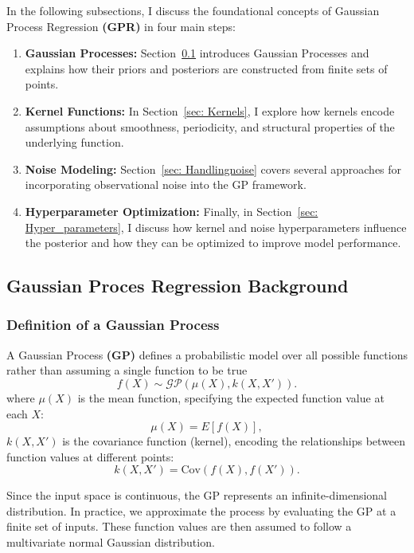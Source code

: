 \documentclass{article}
\begin{document}
In the following subsections, I discuss the foundational concepts of Gaussian Process Regression \textbf{(GPR)} in four main steps:
\begin{enumerate}
    \item \textbf{Gaussian Processes:} Section~\ref{sec: GP_backgroound} introduces Gaussian Processes and explains how their priors and posteriors are constructed from finite sets of points.
    \item \textbf{Kernel Functions:} In Section~\ref{sec: Kernels}, I explore how kernels encode assumptions about smoothness, periodicity, and structural properties of the underlying function.
    \item \textbf{Noise Modeling:} Section~\ref{sec: Handlingnoise} covers several approaches for incorporating observational noise into the GP framework.
    \item \textbf{Hyperparameter Optimization:} Finally, in Section~\ref{sec: Hyper_parameters}, I discuss how kernel and noise hyperparameters influence the posterior and how they can be optimized to improve model performance.
\end{enumerate}

\subsection{Gaussian Proces Regression Background}
\label{sec: GP_backgroound}

\subsubsection*{Definition of a Gaussian Process}
\label{sec: Definition_of_GP}

A Gaussian Process \textbf{(GP)} defines a probabilistic model over all possible functions rather than assuming a single function to be true
\[
f(X) \sim \mathcal{GP} (\mu(X), k(X, X')).
\label{eq: Initial_GP_distribution}
\]
where \( \mu(X) \) is the mean function, specifying the expected function value at each \( X \):
\[
    \mu(X) = {E}[f(X)],
    \label{eq: meandef}
\]
 \( k(X, X') \) is the covariance function (kernel), encoding the relationships between function values at different points:
\[
    k(X, X') = \text{Cov}(f(X), f(X')).
    \label{eq: kerneldef}
\]

\noindent
Since the input space is continuous, the GP represents an infinite-dimensional distribution. 
In practice, we approximate the process by evaluating the GP at a finite set of inputs.
These function values are then assumed to follow a multivariate normal Gaussian distribution.
\end{document}
